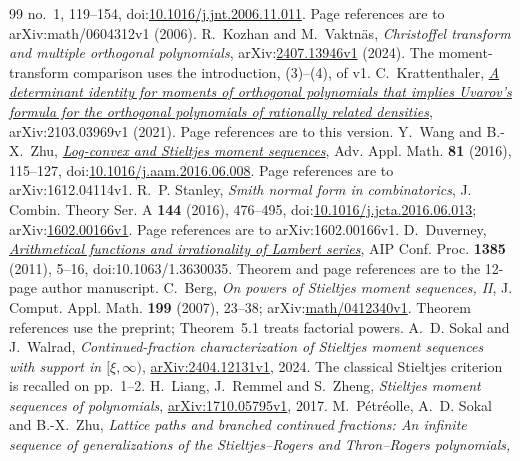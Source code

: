 \begin{thebibliography}{99}
  no.~1, 119--154,
  doi:\href{https://doi.org/10.1016/j.jnt.2006.11.011}{10.1016/j.jnt.2006.11.011}.
  Page references are to arXiv:math/0604312v1 (2006).
 R.~Kozhan and M.~Vaktn\"{a}s,
  \emph{Christoffel transform and multiple orthogonal polynomials},
  arXiv:\href{https://arxiv.org/abs/2407.13946v1}{2407.13946v1} (2024).
  The moment-transform comparison uses the introduction, (3)--(4), of v1.
 C.~Krattenthaler,
  \href{https://arxiv.org/abs/2103.03969v1}{\emph{A determinant identity for
  moments of orthogonal polynomials that implies Uvarov's formula for the
  orthogonal polynomials of rationally related densities}},
  arXiv:2103.03969v1 (2021). Page references are to this version.
 Y.~Wang and B.-X.~Zhu,
  \href{https://arxiv.org/abs/1612.04114v1}{\emph{Log-convex and Stieltjes
  moment sequences}}, Adv. Appl. Math. \textbf{81} (2016), 115--127,
  doi:\href{https://doi.org/10.1016/j.aam.2016.06.008}{10.1016/j.aam.2016.06.008}.
  Page references are to arXiv:1612.04114v1.
 R.~P. Stanley, \emph{Smith normal form in combinatorics},
  J. Combin. Theory Ser. A \textbf{144} (2016), 476--495,
  doi:\href{https://doi.org/10.1016/j.jcta.2016.06.013}{10.1016/j.jcta.2016.06.013};
  arXiv:\href{https://arxiv.org/abs/1602.00166v1}{1602.00166v1}.
  Page references are to arXiv:1602.00166v1.
 D.~Duverney,
  \href{https://doi.org/10.1063/1.3630035}{\emph{Arithmetical functions and
  irrationality of Lambert series}}, AIP Conf. Proc. \textbf{1385} (2011),
  5--16, doi:10.1063/1.3630035. Theorem and page references are to the
  12-page author manuscript.
 C.~Berg, \emph{On powers of Stieltjes moment sequences, II},
  J. Comput. Appl. Math. \textbf{199} (2007), 23--38;
  arXiv:\href{https://arxiv.org/abs/math/0412340v1}{math/0412340v1}.
  Theorem references use the preprint; Theorem~5.1 treats factorial powers.
 A.~D. Sokal and J.~Walrad,
  \emph{Continued-fraction characterization of Stieltjes moment sequences
  with support in $[\xi,\infty)$},
  \href{https://arxiv.org/abs/2404.12131v1}{arXiv:2404.12131v1}, 2024.
  The classical Stieltjes criterion is recalled on pp.~1--2.
 H.~Liang, J.~Remmel and S.~Zheng,
  \emph{Stieltjes moment sequences of polynomials},
  \href{https://arxiv.org/abs/1710.05795v1}{arXiv:1710.05795v1}, 2017.
 M.~P\'etr\'eolle, A.~D. Sokal and B.-X.~Zhu,
  \emph{Lattice paths and branched continued fractions: An infinite sequence
  of generalizations of the Stieltjes--Rogers and Thron--Rogers polynomials,
}
\end{thebibliography}
